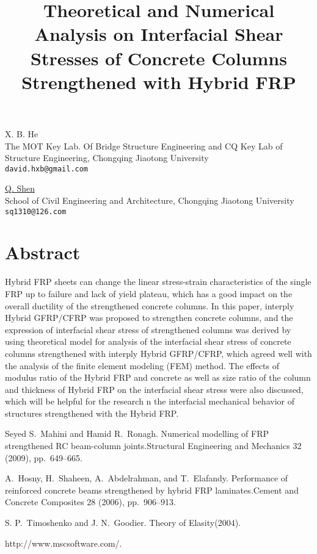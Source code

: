 \title{Theoretical and Numerical Analysis on Interfacial Shear Stresses of Concrete Columns Strengthened with Hybrid FRP}
\author{} \institute{}
\maketitle

\begin{center}
{\large X. B. He}\\
The MOT Key Lab. Of Bridge Structure Engineering and CQ Key Lab of Structure Engineering, Chongqing Jiaotong University\\
{\tt david.hxb@gmail.com}\\
\vspace{4mm}

{\large \underline{Q. Shen}}\\
School of Civil Engineering and Architecture, Chongqing Jiaotong University\\
{\tt sq1310@126.com}
\end{center}

\section*{Abstract}
Hybrid FRP sheets can change the linear stress-strain characteristics of the single FRP up to failure and lack of yield plateau, which has a good impact on the overall ductility of the strengthened concrete columns. In this paper, interply Hybrid GFRP/CFRP was proposed to strengthen concrete columns, and the expression of interfacial shear stress of strengthened columns was derived by using theoretical model for analysis of the interfacial shear stress of concrete columns strengthened with interply Hybrid GFRP/CFRP, which agreed well with the analysis of the finite element modeling (FEM) method. The effects of modulus ratio of the Hybrid FRP and concrete as well as size ratio of the column and thickness of Hybrid FRP on the interfacial shear stress were also discussed, which will be helpful for the research n the interfacial mechanical behavior of structures strengthened with the Hybrid FRP.


\begin{thebibliography}{10}
{\sc Seyed S.~Mahini and Hamid R.~Ronagh}. {Numerical modelling of FRP strengthened RC beam-column joints}.Structural Engineering and Mechanics 32 (2009), pp.~649--665.

{\sc A.~Hosny, H.~Shaheen, A.~Abdelrahman, and T.~Elafandy}. {Performance of reinforced concrete beams strengthened by hybrid FRP laminates}.Cement and Concrete Composites 28 (2006), pp.~906--913.

{\sc S. P.~Timoshenko and J. N.~Goodier}. {Theory of Elasity}(2004).

\bibitem{}
\newblock http://www.mscsoftware.com/.
\end{thebibliography}